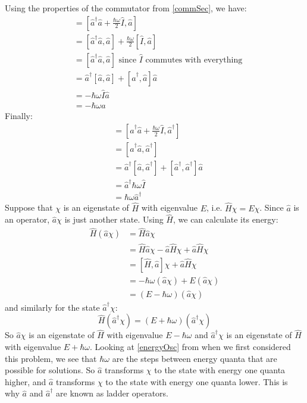 \documentclass[../main.tex]{subfiles}
\begin{document}
Using the properties of the commutator from \cref{commSec}, we have:
\begin{align*}
  [\hat{H}, \hat{a}] &= \left[\hat{a}^{\dag} \hat{a} + \frac{\hbar\omega}{2}\hat{I}, \hat{a}\right] \\
                     &= [\hat{a}^{\dag} \hat{a}, \hat{a}] + \frac{\hbar \omega}{2} [\hat{I}, \hat{a}] \\
                     &= [\hat{a}^{\dag} \hat{a}, \hat{a}] \text{ since $\hat{I}$ commutes with everything} \\
                     &= \hat{a}^{\dag}[\hat{a}, \hat{a}] + [\hat{a}^{\dag}, \hat{a}] \hat{a} \\
                     &= -\hbar\omega\hat{I} \hat{a} \\
                     &= -\hbar \omega \hat{a}
\end{align*}
Finally:
\begin{align*}
  [\hat{H}, \hat{a}^{\dag}] &= \left[\hat{a}^{\dag} \hat{a} + \frac{\hbar\omega}{2}\hat{I}, \hat{a}^{\dag}\right] \\
                            &= [\hat{a}^{\dag} \hat{a}, \hat{a}^{\dag}] \\
                            &= \hat{a}^{\dag}[\hat{a}, \hat{a}^{\dag}] + [\hat{a}^{\dag}, \hat{a}^{\dag}] \hat{a} \\
                            &= \hat{a}^{\dag} \hbar \omega \hat{I} \\
                            &= \hbar \omega \hat{a}^{\dag}
\end{align*}
Suppose that $\chi$ is an eigenstate of $\hat{H}$ with eigenvalue $E$, i.e. $\hat{H} \chi = E \chi$.
Since $\hat{a}$ is an operator, $\hat{a} \chi$ is just another state.
Using $\hat{H}$, we can calculate its energy:
\begin{align*}
  \hat{H}(\hat{a} \chi) &= \hat{H} \hat{a} \chi \\
                        &= \hat{H} \hat{a} \chi - \hat{a} \hat{H} \chi + \hat{a} \hat{H} \chi \\
                        &= [\hat{H}, \hat{a}]\chi + \hat{a} \hat{H} \chi \\
                        &= -\hbar \omega(\hat{a} \chi) + E(\hat{a} \chi) \\
                        &= (E - \hbar \omega) (\hat{a} \chi)
\end{align*}
and similarly for the state $\hat{a}^{\dag} \chi$:
\[
  \hat{H}(\hat{a}^{\dag} \chi) = (E + \hbar \omega)(\hat{a}^{\dag} \chi)
\]
So $\hat{a} \chi$ is an eigenstate of $\hat{H}$ with eigenvalue $E - \hbar \omega$ and $\hat{a}^{\dag} \chi$ is an eigenstate of $\hat{H}$ with eigenvalue $E + \hbar \omega$.
Looking at \cref{energyOsc} from when we first considered this problem, we see that $\hbar \omega$ are the steps between energy quanta that are possible for solutions.
So $\hat{a}$ transforms $\chi$ to the state with energy one quanta higher, and $\hat{a}$ transforms $\chi$ to the state with energy one quanta lower.
This is why $\hat{a}$ and $\hat{a}^{\dag}$ are known as ladder operators.
\end{document}
